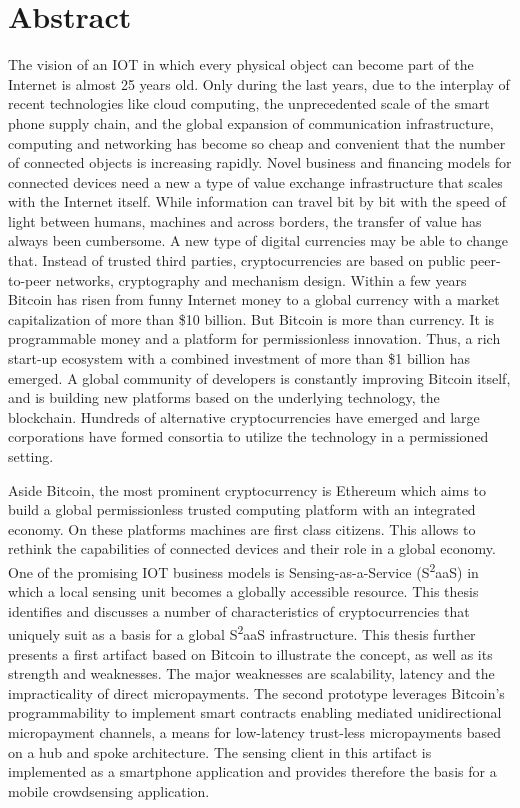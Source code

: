 \begingroup
\let\clearpage\relax
\let\cleardoublepage\relax
\let\cleardoublepage\relax

\chapter*{Abstract}

The vision of an \ac{IOT} in which every physical object can become part of the Internet is almost 25 years old. Only during the last years, due to the interplay of recent technologies like cloud computing, the unprecedented scale of the smart phone supply chain, and the global expansion of communication infrastructure, computing and networking has become so cheap and convenient that the number of connected objects is increasing rapidly. Novel business and financing models for connected devices need a new a type of value exchange infrastructure that scales with the Internet itself. While information can travel bit by bit with the speed of light between humans, machines and across borders, the transfer of value has always been cumbersome. A new type of digital currencies may be able to change that. Instead of trusted third parties, cryptocurrencies are based on public peer-to-peer networks, cryptography and mechanism design. Within a few years Bitcoin has risen from funny Internet money to a global currency with a market capitalization of more than \$10 billion. But Bitcoin is more than currency. It is programmable money and a platform for permissionless innovation. Thus, a rich start-up ecosystem with a combined investment of more than \$1 billion has emerged. A global community of developers is constantly improving Bitcoin itself, and is building new platforms based on the underlying technology, the blockchain. Hundreds of alternative cryptocurrencies have emerged and large corporations have formed consortia to utilize the technology in a permissioned setting.

Aside Bitcoin, the most prominent cryptocurrency is Ethereum which aims to build a global permissionless trusted computing platform with an integrated economy. On these platforms machines are first class citizens. This allows to rethink the capabilities of connected devices and their role in a global economy.
One of the promising \ac{IOT} business models is Sensing-as-a-Service (S\textsuperscript{2}aaS) in which a local sensing unit becomes a globally accessible resource.  This thesis identifies and discusses a number of characteristics of cryptocurrencies that uniquely suit as a basis for a global S\textsuperscript{2}aaS infrastructure. This thesis further presents a first artifact based on Bitcoin to illustrate the concept, as well as its strength and weaknesses. The major weaknesses are scalability, latency and the impracticality of direct micropayments. The second prototype leverages Bitcoin’s programmability to implement smart contracts enabling mediated unidirectional micropayment channels, a means for low-latency trust-less micropayments based on a hub and spoke architecture. The sensing client in this artifact is implemented as a smartphone application and provides therefore the basis for a mobile crowdsensing application.

